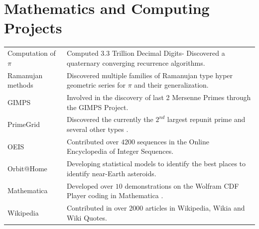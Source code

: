 \documentclass[]{deedy-resume-openfont}
\begin{document}
\section{Mathematics and Computing Projects} 
\hline
\vspace{\topsep}
\begin{tabular}{ll}
Computation of $\pi$ & Computed 3.3 Trillion Decimal Digits- Discovered a quaternary converging recurrence algorithms.\\
 Ramanujan methods & Discovered multiple families of Ramanujan type hyper geometric series for $\pi$ and their generalization.\\
GIMPS&Involved in the discovery of last 2 Mersenne Primes through the GIMPS Project.\\
PrimeGrid& Discovered the currently the $2^{nd}$ largest repunit prime and several other types .\\
OEIS & Contributed over $4200$ sequences in the Online Encyclopedia of Integer Sequences.\\
Orbit@Home&Developing statistical models to identify the best places to identify near-Earth asteroids.\\
Mathematica&Developed over $10$ demonstrations on the Wolfram CDF Player coding in Mathematica .\\
Wikipedia & Contributed in over 2000 articles in Wikipedia, Wikia and Wiki Quotes. \\

\end{tabular}
\sectionsep
\end{document}
